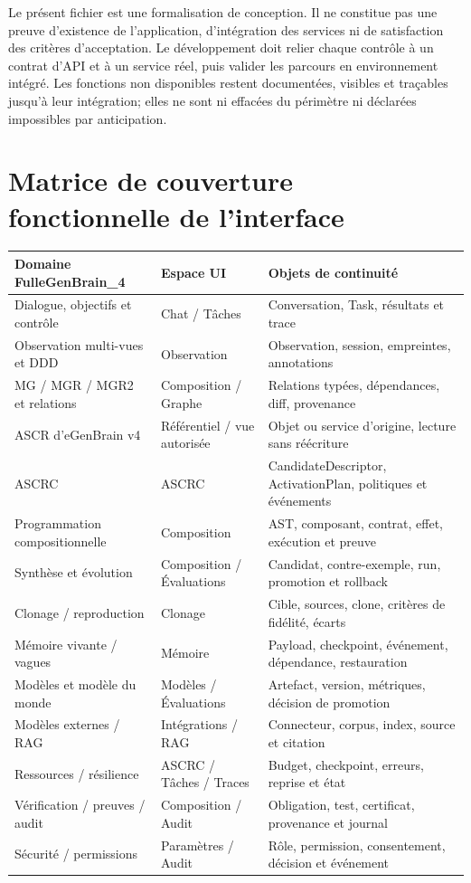 \documentclass[11pt,a4paper]{article}
\begin{document}
Le présent fichier est une formalisation de conception. Il ne constitue pas une preuve d'existence de l'application, d'intégration des services ni de satisfaction des critères d'acceptation. Le développement doit relier chaque contrôle à un contrat d'API et à un service réel, puis valider les parcours en environnement intégré. Les fonctions non disponibles restent documentées, visibles et traçables jusqu'à leur intégration; elles ne sont ni effacées du périmètre ni déclarées impossibles par anticipation.

\appendix
\section{Matrice de couverture fonctionnelle de l'interface}
\begin{longtable}{p{}p{}p{}}
\toprule
\textbf{Domaine FulleGenBrain\_4} & \textbf{Espace UI} & \textbf{Objets de continuité}\\
\midrule
Dialogue, objectifs et contrôle & Chat / Tâches & Conversation, Task, résultats et trace\\
Observation multi-vues et DDD & Observation & Observation, session, empreintes, annotations\\
MG / MGR / MGR2 et relations & Composition / Graphe & Relations typées, dépendances, diff, provenance\\
ASCR d'eGenBrain v4 & Référentiel / vue autorisée & Objet ou service d'origine, lecture sans réécriture\\
ASCRC & ASCRC & CandidateDescriptor, ActivationPlan, politiques et événements\\
Programmation compositionnelle & Composition & AST, composant, contrat, effet, exécution et preuve\\
Synthèse et évolution & Composition / Évaluations & Candidat, contre-exemple, run, promotion et rollback\\
Clonage / reproduction & Clonage & Cible, sources, clone, critères de fidélité, écarts\\
Mémoire vivante / vagues & Mémoire & Payload, checkpoint, événement, dépendance, restauration\\
Modèles et modèle du monde & Modèles / Évaluations & Artefact, version, métriques, décision de promotion\\
Modèles externes / RAG & Intégrations / RAG & Connecteur, corpus, index, source et citation\\
Ressources / résilience & ASCRC / Tâches / Traces & Budget, checkpoint, erreurs, reprise et état\\
Vérification / preuves / audit & Composition / Audit & Obligation, test, certificat, provenance et journal\\
Sécurité / permissions & Paramètres / Audit & Rôle, permission, consentement, décision et événement\\
\bottomrule
\end{longtable}
\end{document}
